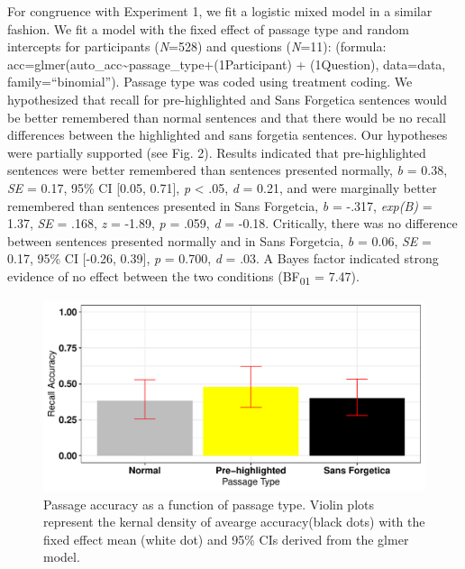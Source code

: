 \documentclass[english,doc]{apa6}
\begin{document}
For congruence with Experiment 1, we fit a logistic mixed model in a similar fashion. We fit a model with the fixed effect of passage type and random intercepts for participants (\emph{N}=528) and questions (\emph{N}=11): (formula: acc=glmer(auto\_acc\textasciitilde{}passage\_type+(1\textbar{}Participant) + (1\textbar{}Question), data=data, family=\enquote{binomial}). Passage type was coded using treatment coding. We hypothesized that recall for pre-highlighted and Sans Forgetica sentences would be better remembered than normal sentences and that there would be no recall differences between the highlighted and sans forgetia sentences. Our hypotheses were partially supported (see Fig. 2). Results indicated that pre-highlighted sentences were better remembered than sentences presented normally, \emph{b} = 0.38, \emph{SE} = 0.17, 95\% CI {[}0.05, 0.71{]}, \emph{p} \textless{} .05, \emph{d} = 0.21, and were marginally better remembered than sentences presented in Sans Forgetcia, \emph{b} = -.317, \emph{exp(B)} = 1.37, \emph{SE} = .168, \emph{z} = -1.89, \emph{p} = .059, \emph{d} = -0.18. Critically, there was no difference between sentences presented normally and in Sans Forgetcia, \emph{b} = 0.06, \emph{SE} = 0.17, 95\% CI {[}-0.26, 0.39{]}, \emph{p} = 0.700, \emph{d} = .03. A Bayes factor indicated strong evidence of no effect between the two conditions (BF\textsubscript{01} = 7.47).

\begin{figure}

{\centering \includegraphics{SF_Paper_files/figure-latex/unnamed-chunk-3-1} 

}

\caption{Passage accuracy as a function of passage type. Violin plots represent the kernal density of avearge accuracy(black dots) with the fixed effect mean (white dot) and 95\%  CIs derived from the glmer model.}\label{fig:unnamed-chunk-3}
\end{figure}
\end{document}
